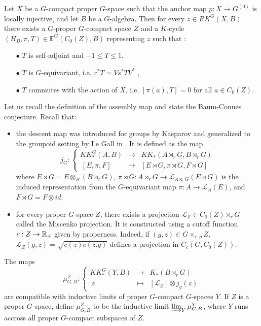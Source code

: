 \begin{lem}\label{JLTform}
Let $X$ be a $G$-compact proper $G$-space such that the anchor map $p:X\rightarrow G^{(0)}$ is locally injective, and let $B$ be a $G$-algebra. Then for every $z\in RK^G(X,B)$ there exists a $G$-proper $G$-compact space $Z$ and a $K$-cycle $(H_B, \pi, T)\in \mathbb E^G(C_0(Z),B)$ representing $z$ such that :
\begin{itemize}
\item[$\bullet$] $T$ is self-adjoint and $-1 \leq T\leq 1$,
\item[$\bullet$] $T$ is $G$-equivariant, i.e. $r^* T = V s^*T V^*$ ,
\item[$\bullet$] $T$ commutes with the action of $X$, i.e. $[\pi(a),T]= 0$ for all $a\in C_0(Z)$.
\end{itemize}
\end{lem}

Let us recall the definition of the assembly map and state the Baum-Connes conjecture. Recall that:
\begin{itemize}
\item the descent map was introduced for groups by Kasparov and generalized to the groupoid setting by Le Gall in \cite{LeGall}. It is defined as the map
\[j_G : \left\{ \begin{array}{rcl}
KK^G_*(A,B)  & \rightarrow & KK_*(A\rtimes_r G , B \rtimes_r G) \\
\ [ E,\pi, F]    & \mapsto     & [E\rtimes G, \pi\rtimes G, F\rtimes G] 
\end{array}\right.  \] 
where 
$E\rtimes G = E\otimes_{B} (B\rtimes_r G)$, 
$\pi \rtimes G: A\rtimes_r G \rightarrow \mathcal L_{A\rtimes_r G}(E\rtimes G)$ is the induced representation from the $G$-equivariant map $\pi:A \rightarrow \mathcal L_{A}(E)$, and $F\rtimes G = F\otimes id$.
\item for every proper $G$-space $Z$, there exists a projection $\mathcal L_Z \in C_0(Z)\rtimes_r G$ called the Miscenko projection. It is constructed using a cutoff function $c: Z \rightarrow \mathbb R_+$ given by properness. Indeed, if $(g,z)\in G\times_{r,p} Z$, $\mathcal L_Z(g,z)= \sqrt{c(z)c(z.g)}$ defines a projection in $C_c(G,C_0(Z))$.
\end{itemize} 
 
The maps 
\[\mu^Z_{G,B} : \left\{ \begin{array}{rcl}
KK^G_*(Y,B)  & \rightarrow & K_*(B\rtimes_r G) \\
\ z   & \mapsto     & [\mathcal L_Z]\otimes j_g(z) 
\end{array}\right.  \] 
are compatible with inductive limits of proper $G$-compact $G$-spaces $Y$. If $Z$ is a proper $G$-space, define $\mu_{G,B}^Z$ to be the inductive limit $\varinjlim_Y \mu^Y_{G,B}$, where $Y$ runs accross all proper $G$-compact subspaces of $Z$.   

